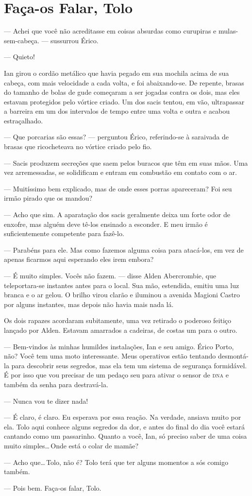 \chapter{Faça-os Falar, Tolo}

--- Achei que você não acreditasse em coisas absurdas como curupiras e
mulas-sem-cabeça. --- sussurrou Érico.

--- Quieto!

Ian girou o cordão metálico que havia pegado em sua mochila acima de sua
cabeça, com mais velocidade a cada volta, e foi abaixando-se. De
repente, brasas do tamanho de bolas de gude começaram a ser jogadas
contra os dois, mas eles estavam protegidos pelo vórtice criado. Um dos
sacis tentou, em vão, ultrapassar a barreira em um dos intervalos de
tempo entre uma volta e outra e acabou estraçalhado.

--- Que porcarias são essas? --- perguntou Érico, referindo-se à
saraivada de brasas que ricocheteava no vórtice criado pelo fio.

--- Sacis produzem secreções que saem pelos buracos que têm em suas
mãos. Uma vez arremessadas, se solidificam e entram em combustão em
contato com o ar.

--- Muitíssimo bem explicado, mas de onde esses porras apareceram? Foi
seu irmão pirado que os mandou?

--- Acho que sim. A aparatação dos sacis geralmente deixa um forte odor
de enxofre, mas alguém deve tê-los ensinado a esconder. E meu irmão é
suficientemente competente para fazê-lo.

--- Parabéns para ele. Mas como fazemos alguma coisa para atacá-los, em
vez de apenas ficarmos aqui esperando eles irem embora?

--- É muito simples. Vocês não fazem. --- disse Alden Abercrombie, que
teleportara-se instantes antes para o local. Sua mão, estendida, emitiu
uma luz branca e o ar gelou. O brilho virou clarão e iluminou a avenida
Magioni Castro por alguns instantes, mas depois não havia mais nada lá.


Os dois rapazes acordaram subitamente, uma vez retirado o poderoso
feitiço lançado por Alden. Estavam amarrados a cadeiras, de costas um
para o outro.

--- Bem-vindos às minhas humildes instalações, Ian e seu amigo. Érico
Porto, não? Você tem uma moto interessante. Meus operativos estão
tentando desmontá-la para descobrir seus segredos, mas ela tem um
sistema de segurança formidável. É por isso que vou precisar de um
pedaço seu para ativar o sensor de \textsc{dna} e também da senha para
destravá-la.

--- Nunca vou te dizer nada!

--- É claro, é claro. Eu esperava por essa reação. Na verdade, ansiava
muito por ela. Tolo aqui conhece alguns segredos da dor, e antes do
final do dia você estará cantando como um passarinho. Quanto a você,
Ian, só preciso saber de uma coisa muito simples\ldots\,Onde está o
colar de mamãe?

--- Acho que\ldots\,Tolo, não é? Tolo terá que ter alguns momentos a sós
comigo também.

--- Pois bem. Faça-os falar, Tolo.
